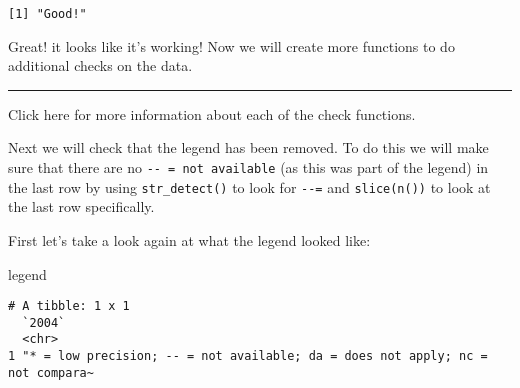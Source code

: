 \documentclass[
]{article}
\newenvironment{Shaded}{\begin{snugshade}}{\end{snugshade}}
\newcommand{\CommentTok}[1]{\textcolor[rgb]{0.56,0.35,0.01}{\textit{#1}}}
\newcommand{\ControlFlowTok}[1]{\textcolor[rgb]{0.13,0.29,0.53}{\textbf{#1}}}
\newcommand{\DataTypeTok}[1]{\textcolor[rgb]{0.13,0.29,0.53}{#1}}
\newcommand{\FloatTok}[1]{\textcolor[rgb]{0.00,0.00,0.81}{#1}}
\newcommand{\KeywordTok}[1]{\textcolor[rgb]{0.13,0.29,0.53}{\textbf{#1}}}
\newcommand{\NormalTok}[1]{#1}
\newcommand{\OperatorTok}[1]{\textcolor[rgb]{0.81,0.36,0.00}{\textbf{#1}}}
\newcommand{\OtherTok}[1]{\textcolor[rgb]{0.56,0.35,0.01}{#1}}
\newcommand{\StringTok}[1]{\textcolor[rgb]{0.31,0.60,0.02}{#1}}
\begin{document}
\begin{verbatim}
[1] "Good!"
\end{verbatim}

Great! it looks like it's working! Now we will create more functions to
do additional checks on the data.

\begin{center}\rule{0.5\linewidth}{0.5pt}\end{center}

Click here for more information about each of the check functions.

Next we will check that the legend has been removed. To do this we will
make sure that there are no \texttt{-\/-\ =\ not\ available} (as this
was part of the legend) in the last row by using \texttt{str\_detect()}
to look for \texttt{-\/-=} and \texttt{slice(n())} to look at the last
row specifically.

First let's take a look again at what the legend looked like:

\begin{Shaded}
\begin{Highlighting}[]
\NormalTok{legend}
\end{Highlighting}
\end{Shaded}

\begin{verbatim}
# A tibble: 1 x 1
  `2004`                                                                        
  <chr>                                                                         
1 "* = low precision; -- = not available; da = does not apply; nc = not compara~
\end{verbatim}

\begin{Shaded}
\end{Shaded}
\end{document}
